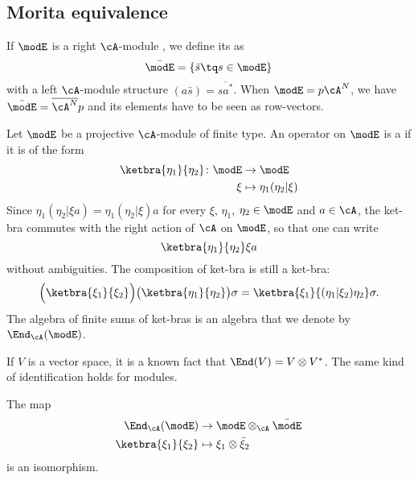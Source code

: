 					\subsection{Morita equivalence}

If $\modE$ is a right $\cA$-module , we define its  as
\begin{equation}
\bar\modE=\{ \bar s\tq s\in\modE \}
\end{equation}
with a left $\cA$-module structure $(a\bar s)=\overline{  sa^* }$. When $\modE=p\cA^N$, we have $\bar\modE=\overline{ \cA^N }p$ and its elements have to be seen as row-vectors. 

Let $\modE$ be a projective $\cA$-module of finite type. An operator on $\modE$ is a  if it is of the form
\begin{equation}
\begin{aligned}
 \ketbra{\eta_1}{\eta_2} \colon \modE&\to \modE \\ 
   \xi&\mapsto \eta_1( \eta_2 | \xi)  
\end{aligned}
\end{equation}
Since $\eta_1( \eta_2 | \xi a) =\eta_1( \eta_2 | \xi) a$ for every $\xi$, $\eta_1$, $\eta_2\in\modE$ and $a\in\cA$, the ket-bra commutes with the right action of $\cA$ on $\modE$, so that one can write 
\[ 
  \ketbra{\eta_1}{\eta_2} \xi a
\]
without ambiguities. The composition of ket-bra is still a ket-bra:
\begin{equation}
\Big( \ketbra{\xi_1}{\xi_2}  \Big)\big( \ketbra{\eta_1}{\eta_2}  \big)\sigma = \ketbra{\xi_1}{( \eta_1 | \xi_2) \eta_2} \sigma.
\end{equation}
The algebra of finite sums of ket-bras is an algebra that we denote by $\End_{\cA}(\modE)$.

If $V$ is a vector space, it is a known fact that $\End(V)=V\otimes V^*$. The same kind of identification holds for modules.
\begin{proposition}
The map
\begin{equation}
\begin{aligned}
 \End_{\cA}(\modE)&\to \modE\otimes_{\cA}\bar\modE  \\ 
   \ketbra{\xi_1}{\xi_2} &\mapsto \xi_1\otimes\bar\xi_2 
\end{aligned}
\end{equation}
is an isomorphism.
\end{proposition}

